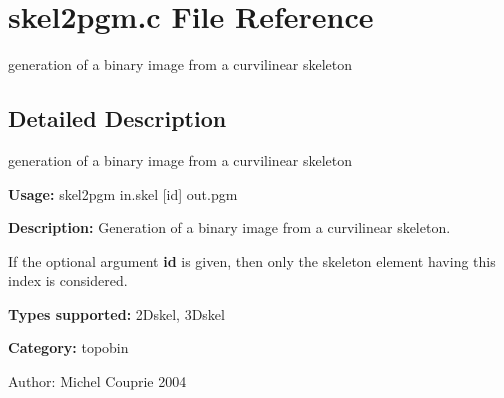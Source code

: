 \section{skel2pgm.c File Reference}
\label{skel2pgm_8c}
generation of a binary image from a curvilinear skeleton  




\label{_details}
\subsection{Detailed Description}
generation of a binary image from a curvilinear skeleton 

{\bf Usage:} skel2pgm in.skel [id] out.pgm

{\bf Description:} Generation of a binary image from a curvilinear skeleton.

If the optional argument {\bf id} is given, then only the skeleton element having this index is considered.

{\bf Types supported:} 2Dskel, 3Dskel

{\bf Category:} topobin

\begin{Desc}
\item[Author:]Michel Couprie 2004 \end{Desc}

